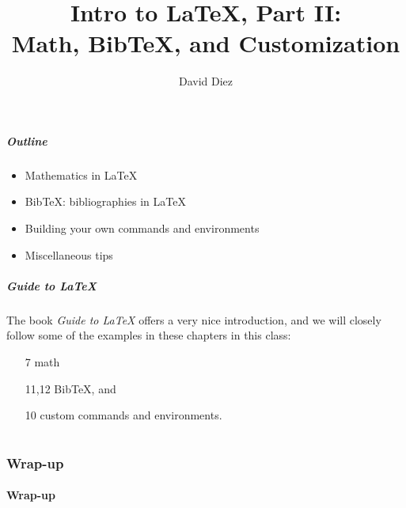 \documentclass[slidestop,compress,mathserif]{beamer}
\title{Intro to LaTeX, Part II: \\Math, BibTeX, and Customization}
\subtitle{}
\author{David Diez}
\institute{OpenIntro \\ \href{http://www.openintro.org}{openintro.org}}
\date{}
\begin{document}
\newenvironment{act}[1]{{\color{command}#1}}{}
\newcommand{\lcom}[1]{{\color{command}$\backslash$#1}}
\newcommand{\larg}[1]{{\color{braces}$\{${\color{black}#1}$\}$}}
\newcommand{\mathText}[1]{{\color{braces}\${\color{black}#1}\$}}


\frame{ \titlepage }

\begin{frame}
  \frametitle{Outline}
  \begin{itemize}
  \item Mathematics in LaTeX
  \item BibTeX: bibliographies in LaTeX
  \item Building your own commands and environments
  \item Miscellaneous tips
  \end{itemize}
\end{frame}

\begin{frame}  \frametitle{Guide to LaTeX}
The book \textit{Guide to LaTeX} offers a very nice introduction, and we will closely follow some of the examples in these chapters in this class:
\begin{itemize}
\item[7] math
\item[11,12] BibTeX, and
\item[10] custom commands and environments.
\end{itemize}
\end{frame}

\part{}





\section[Wrap-up]{Wrap-up}
\subsection[Wrap-up]{Wrap-up}
\end{document}
